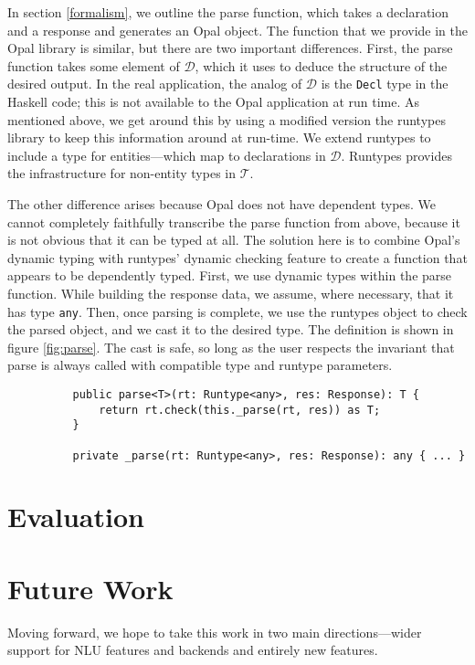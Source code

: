 \documentclass[twocolumn]{article}
\newcommand{\ts}[1]{\texttt{#1}}
\newcommand{\hs}[1]{\texttt{#1}}
\newcommand{\fcy}[1]{\mathcal{#1}}
\begin{document}
In section \ref{formalism}, we outline the parse function, which takes a
declaration and a response and generates an Opal object. The function that we
provide in the Opal library is similar, but there are two important differences.
First, the parse function takes some element of $\fcy{D}$, which it uses to
deduce the structure of the desired output. In the real application, the analog
of $\fcy{D}$ is the \hs{Decl} type in the Haskell code; this is not available to
the Opal application at run time. As mentioned above, we get around this by
using a modified version the runtypes library to keep this information around at
run-time. We extend runtypes to include a type for entities---which map to
declarations in $\fcy{D}$. Runtypes provides the infrastructure for non-entity
types in $\fcy{T}$.

The other difference arises because Opal does not have dependent types. We
cannot completely faithfully transcribe the parse function from above, because
it is not obvious that it can be typed at all. The solution here is to combine
Opal's dynamic typing with runtypes' dynamic checking feature to create a
function that appears to be dependently typed. First, we use dynamic types
within the parse function. While building the response data, we assume, where
necessary, that it has type \ts{any}. Then, once parsing is complete, we use the
runtypes object to check the parsed object, and we cast it to the desired type.
The definition is shown in figure \ref{fig:parse}. The cast is safe, so long as
the user respects the invariant that parse is always called with compatible type
and runtype parameters.

\begin{figure*}
\begin{verbatim}
          public parse<T>(rt: Runtype<any>, res: Response): T {
              return rt.check(this._parse(rt, res)) as T;
          }

          private _parse(rt: Runtype<any>, res: Response): any { ... }
\end{verbatim}
  \caption{The wit parse functions.}
  \label{fig:parse}
\end{figure*}

\section{Evaluation} \label{evaluation}

\section{Future Work} \label{future}
Moving forward, we hope to take this work in two main directions---wider support
for NLU features and backends and entirely new features.
\end{document}
